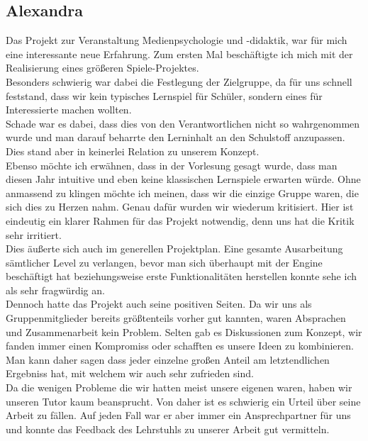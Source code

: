 \documentclass[10pt,a4paper,notitlepage]{report}
\begin{document}
	\subsection{Alexandra}
			Das Projekt zur Veranstaltung Medienpsychologie und -didaktik, war für mich eine interessante neue Erfahrung. 			Zum ersten Mal beschäftigte ich mich mit der Realisierung eines größeren Spiele-Projektes. \\
	Besonders schwierig war dabei die Festlegung der Zielgruppe, da für uns schnell feststand, dass wir kein typisches Lernspiel 			für Schüler, sondern eines für Interessierte machen wollten.\\
	Schade war es dabei, dass dies von den Verantwortlichen nicht so wahrgenommen wurde und man darauf beharrte den 				Lerninhalt an den Schulstoff anzupassen. Dies stand aber in keinerlei Relation zu unserem Konzept.\\
	Ebenso möchte ich erwähnen, dass in der Vorlesung gesagt wurde, dass man diesen Jahr intuitive und eben keine klassischen 			Lernspiele erwarten würde. Ohne anmassend zu klingen möchte ich meinen, dass wir die einzige Gruppe waren, die sich dies zu 	Herzen nahm. Genau dafür wurden wir wiederum kritisiert. Hier ist eindeutig ein klarer Rahmen für das Projekt notwendig, 			denn uns hat die Kritik sehr irritiert.\\
	Dies äußerte sich auch im generellen Projektplan. Eine gesamte Ausarbeitung sämtlicher Level zu verlangen, bevor man sich 			überhaupt mit der Engine beschäftigt hat beziehungsweise erste Funktionalitäten herstellen konnte sehe ich als sehr 				fragwürdig an.\\
	Dennoch hatte das Projekt auch seine positiven Seiten. Da wir uns als Gruppenmitglieder bereits größtenteils vorher gut 			kannten, waren Absprachen und Zusammenarbeit kein Problem. Selten gab es Diskussionen zum Konzept, wir fanden immer 			einen Kompromiss oder schafften es unsere Ideen zu kombinieren. Man kann daher sagen dass jeder einzelne großen Anteil am 	letztendlichen Ergebniss hat, mit welchem wir auch sehr zufrieden sind.\\
	Da die wenigen Probleme die wir hatten meist unsere eigenen waren, haben wir unseren Tutor kaum beansprucht. Von daher 			ist es schwierig ein Urteil über seine Arbeit zu fällen. Auf jeden Fall war er aber immer ein Ansprechpartner für uns und konnte 			das Feedback des Lehrstuhls zu unserer Arbeit gut vermitteln.\\
\end{document}
